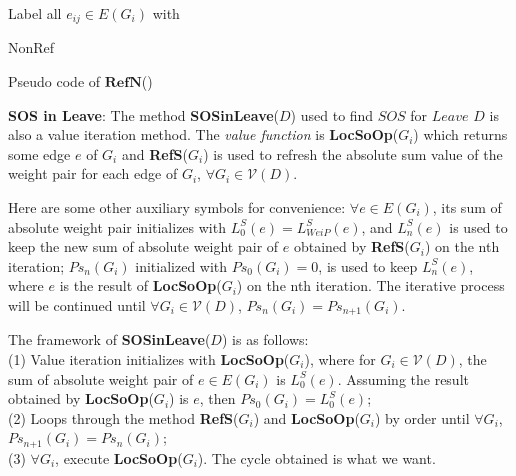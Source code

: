 \documentclass{acm_proc_article-sp}
\begin{document}
\begin{algorithm}[!h]
\scriptsize
 Label all $e_{\textit{ij}}\in E(G_{\textit{i}})$ with \begin{bf}NonRef\end{bf}\;
 \caption{Pseudo code of $\mathbf{RefN}$()}
 \label{refreshweip}
\end{algorithm}


\textbf{SOS in Leave}: The method \textbf{SOSinLeave}($D$) used to find $\textit{SOS}$ for $\textit{Leave}$ $D$ is also a value iteration method. The \textit{value function} is \textbf{LocSoOp}($G_{\textit{i}}$) which returns some edge $e$ of $G_{\textit{i}}$ and \textbf{RefS}($G_{\textit{i}}$) is used to refresh the absolute sum value of the weight pair for each edge of $G_{\textit{i}}$, $\forall G_{\textit{i}}\in \mathcal{V}(D)$.

Here are some other auxiliary symbols for convenience: $\forall e\in E(G_{\textit{i}})$, its sum of absolute weight pair initializes with $L_0^{\textit{S}}(e)=L_{\textit{WeiP}}^S(e)$, and $L_{\textit{n}}^{\textit{S}}(e)$ is used to keep the new sum of absolute weight pair of $e$ obtained by \textbf{RefS}($G_{\textit{i}}$) on the nth iteration; $Ps_{\textit{n}}(G_{i})$ initialized with $Ps_0(G_{i})=0$, is used to keep $L_{\textit{n}}^{\textit{S}}(e)$, where $e$ is the result of \textbf{LocSoOp}($G_{\textit{i}}$) on the nth iteration. The iterative process will be continued until $\forall G_{\textit{i}}\in \mathcal{V}(D)$, $Ps_{\textit{n}}(G_{i})=Ps_{\textit{n+1}}(G_{i})$.

The framework of \textbf{SOSinLeave}($D$) is as follows:\\
(1) Value iteration initializes with \textbf{LocSoOp}($G_{\textit{i}}$), where for $G_{\textit{i}}\in \mathcal{V}(D)$, the sum of absolute weight pair of $e\in E(G_{\textit{i}})$ is $L_0^{\textit{S}}(e)$. Assuming the result obtained by \textbf{LocSoOp}($G_{\textit{i}}$) is $e$, then $Ps_0(G_{\textit{i}})=L_0^{\textit{S}}(e)$;\\
(2) Loops through the method \textbf{RefS}($G_{\textit{i}}$) and \textbf{LocSoOp}($G_{\textit{i}}$) by order until $\forall G_{\textit{i}}$, $Ps_{\textit{n+1}}(G_{\textit{i}}) =Ps_{\textit{n}}(G_{\textit{i}})$;\\
(3) $\forall G_{\textit{i}}$, execute \textbf{LocSoOp}($G_{\textit{i}}$). The cycle obtained is what we want.
\end{document}
